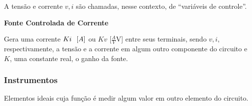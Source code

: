\documentclass{article}
\numberwithin{equation}{section}
\newlength\Colsep
\begin{document}
A tensão e corrente $v,i$ são chamadas, nesse contexto, de ``variáveis de controle''.

\begin{center}{\textbf{Fonte Controlada de Corrente}}\end{center}
Gera uma corrente $Ki \hspace{0.25cm}[A]$ ou $Kv$ \hspace{0.25cm}[$\frac{A}{V}$V] entre seus terminais, sendo $v,i$, respectivamente, a tensão e a corrente em algum outro componente do circuito e $K$, uma constante real, o ganho da fonte. \\
\begin{minipage}[c][4cm]{\dimexpr\textwidth-0.5\Colsep\relax}
\end{minipage}

\newpage
\subsubsection{Instrumentos}
\label{subsubsec:instrumentos}
Elementos ideais cuja função é medir algum valor em outro elemento do circuito.

\vspace{-1.6cm}
\end{document}
